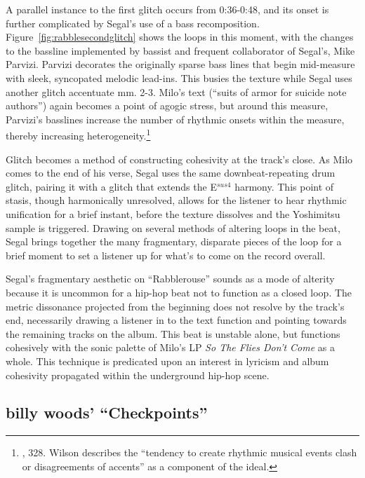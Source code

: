 A parallel instance to the first glitch occurs from 0:36-0:48, and its onset is further complicated
by Segal's use of a bass recomposition. Figure~\ref{fig:rabblesecondglitch} shows the loops in this 
moment, with the changes to the bassline implemented by bassist and frequent collaborator of Segal's, 
Mike Parvizi. Parvizi decorates the originally sparse bass lines that begin mid-measure with sleek,
syncopated melodic lead-ins. This busies the texture while Segal uses another glitch accentuate
mm. 2-3. Milo's text (``suits of armor for suicide note authors'') again becomes a point of agogic 
stress, but around this measure, Parvizi's basslines increase the number of rhythmic onsets within 
the measure, thereby increasing heterogeneity.\footnote{
    \cite{ollywilsonHeterogeneousSoundIdeal1992}, 328. Wilson describes the ``tendency to create 
    rhythmic musical events clash or disagreements of accents'' as a component of the ideal.}

Glitch becomes a method of constructing cohesivity at the track's close. As Milo comes to the end
of his verse, Segal uses the same downbeat-repeating drum glitch, pairing it with a glitch that 
extends the E$^{sus4}$ harmony. This point of stasis, though harmonically unresolved, allows
for the listener to hear rhythmic unification for a brief instant, before the texture dissolves and
the Yoshimitsu sample is triggered. Drawing on several methods of altering loops in the beat, Segal
brings together the many fragmentary, disparate pieces of the loop for a brief moment to set a 
listener up for what's to come on the record overall.

Segal's fragmentary aesthetic on ``Rabblerouse'' sounds as a mode of alterity because it is uncommon
for a hip-hop beat not to function as a closed loop. The metric dissonance projected from the 
beginning does not resolve by the track's end, necessarily drawing a listener in to the text function
and pointing  towards the remaining tracks on the album. This beat is unstable alone, but functions 
cohesively with the sonic palette of Milo's LP \textit{So The Flies Don't Come} as a whole. This 
technique is predicated  upon an interest in lyricism and album cohesivity propagated within the
underground hip-hop scene.

\subsection*{\centering billy woods' ``Checkpoints''}

